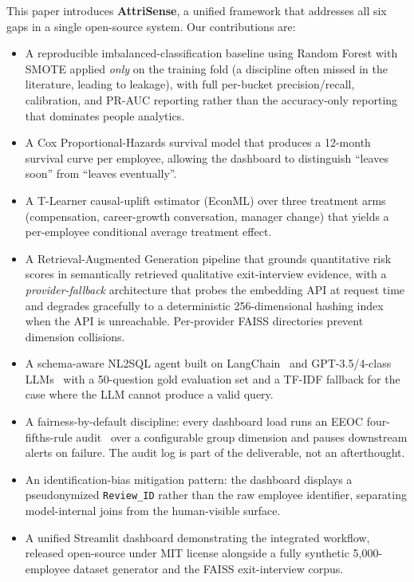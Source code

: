 \documentclass[conference]{IEEEtran}
\begin{document}
This paper introduces \textbf{AttriSense}, a unified framework that
addresses all six gaps in a single open-source system. Our
contributions are:

\begin{itemize}
\item A reproducible imbalanced-classification baseline using Random
Forest with SMOTE applied \emph{only} on the training fold (a
discipline often missed in the literature, leading to leakage), with
full per-bucket precision/recall, calibration, and PR-AUC reporting
rather than the accuracy-only reporting that dominates people
analytics.
\item A Cox Proportional-Hazards survival model that produces a
12-month survival curve per employee, allowing the dashboard to
distinguish ``leaves soon'' from ``leaves eventually''.
\item A T-Learner causal-uplift estimator (EconML) over three
treatment arms (compensation, career-growth conversation, manager
change) that yields a per-employee conditional average treatment
effect.
\item A Retrieval-Augmented Generation pipeline that grounds
quantitative risk scores in semantically retrieved qualitative
exit-interview evidence, with a \emph{provider-fallback} architecture
that probes the embedding API at request time and degrades gracefully
to a deterministic 256-dimensional hashing index when the API is
unreachable. Per-provider FAISS directories prevent dimension
collisions.
\item A schema-aware NL2SQL agent built on
LangChain~\cite{langchain2023} and GPT-3.5/4-class
LLMs~\cite{brown2020} with a 50-question gold evaluation set and a
TF-IDF fallback for the case where the LLM cannot produce a valid
query.
\item A fairness-by-default discipline: every dashboard load runs an
EEOC four-fifths-rule audit~\cite{nyclaw2023} over a configurable
group dimension and pauses downstream alerts on failure. The audit
log is part of the deliverable, not an afterthought.
\item An identification-bias mitigation pattern: the dashboard
displays a pseudonymized \texttt{Review\_ID} rather than the raw
employee identifier, separating model-internal joins from the
human-visible surface.
\item A unified Streamlit dashboard demonstrating the integrated
workflow, released open-source under MIT license alongside a fully
synthetic 5{,}000-employee dataset generator and the FAISS
exit-interview corpus.
\end{itemize}
\end{document}
